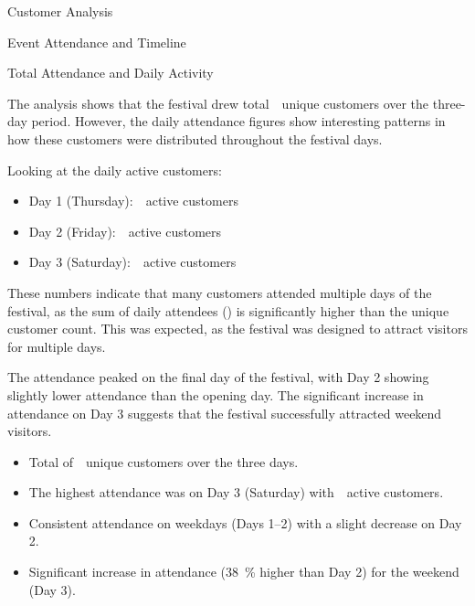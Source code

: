 \begin{section}{Customer Analysis}
\begin{subsection}{Event Attendance and Timeline}
		\pagebreak[4]

		\begin{subsubsection}{Total Attendance and Daily Activity}
			\label{subsubsec:analysis-total-attendance}


			The analysis shows that the festival drew total~~unique customers over the three-day period.
			However, the daily attendance figures show interesting patterns in how these customers were distributed throughout the festival days.

			Looking at the daily active customers:
			\begin{itemize}
				\item Day 1 (Thursday):~~active customers
				\item Day 2 (Friday):~~active customers
				\item Day 3 (Saturday):~~active customers
			\end{itemize}

			These numbers indicate that many customers attended multiple days of the festival, as the sum of daily attendees () is significantly higher than the unique customer count.
			This was expected, as the festival was designed to attract visitors for multiple days.

			The attendance peaked on the final day of the festival, with Day 2 showing slightly lower attendance than the opening day.
			The significant increase in attendance on Day 3 suggests that the festival successfully attracted weekend visitors.

			\begin{keytakeaways}
				\begin{itemize}
					\item Total of~~unique customers over the three days.
					\item The highest attendance was on Day 3 (Saturday) with~~active customers.
					\item Consistent attendance on weekdays (Days 1–2) with a slight decrease on Day 2.
					\item Significant increase in attendance (38~\% higher than Day 2) for the weekend (Day 3).
				\end{itemize}
			\end{keytakeaways}
		\end{subsubsection}


\end{subsection}
\end{section}
